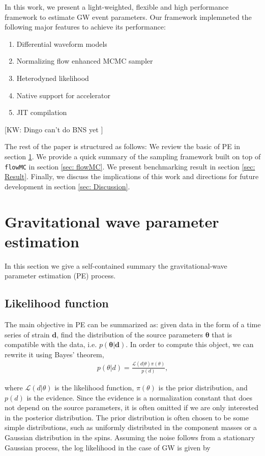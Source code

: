 \documentclass[twocolumn]{aastex631}
\newcommand{\kw}[1]{{\color{rb4}[KW: #1 ]}}
\begin{document}

In this work, we present a light-weighted, flexible and high performance
framework to estimate GW event parameters. Our framework implemneted the
following major features to achieve its performance:
\begin{enumerate}
\item Differential waveform models
\item Normalizing flow enhanced MCMC sampler
\item Heterodyned likelihood
\item Native support for accelerator
\item JIT compilation
\end{enumerate}
\kw{Dingo can't do BNS yet}


The rest of the paper is structured as follows: We review the basic of PE in
section \ref{sec: PE}. We provide a quick summary of the sampling framework
built on top of \texttt{flowMC} in section \ref{sec: flowMC}. We present
benchmarking result in section \ref{sec: Result}. Finally, we discuss the
implications of this work and directions for future development in section
\ref{sec: Discussion}.

\section{Gravitational wave parameter estimation}
\label{sec: PE}

In this section we give a self-contained summary the gravitational-wave
parameter estimation (PE) process.

\subsection{Likelihood function}
\label{sec:likelihood}

The main objective in PE can be summarized as: given data in the form of a time
series of strain $\mathbf{d}$, find the distribution of the source parameters
$\mathbf{\theta}$ that is compatible with the data, i.e.
$p(\mathbf{\theta}|\mathbf{d})$. In order to compute this object, we can rewrite
it using Bayes' theorem,
\begin{align}
    p(\theta| d) = \frac{\mathcal{L}(d|\theta)\pi(\theta)}{p(d)},
\end{align}

where $\mathcal{L}(d|\theta)$ is the likelihood function, $\pi(\theta)$ is the
prior distribution, and $p(d)$ is the evidence. Since the evidence is a
normalization constant that does not depend on the source parameters, it is
often omitted if we are only interested in the posterior distribution. The prior
distribution is often chosen to be some simple distributions, such as uniformly
distributed in the component masses or a Gaussian distribution in the spins.
Assuming the noise follows from a stationary Gaussian process, the log
likelihood in the case of GW is given by
\end{document}
